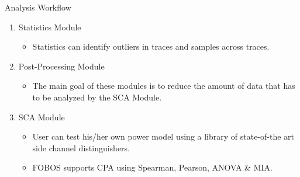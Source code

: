 \documentclass[xcolor=pdftex,dvipsnames,table,final]{beamer}
\begin{document}
\begin{frame}[fragile]{}
\begin{columns}[t]
\begin{column}{.31\linewidth}
\begin{block}{Analysis Workflow}
\begin{center}
        \end{center} 
        \vspace{-1ex}
        \begin{enumerate}
          \item Statistics Module
          \begin{itemize}
            \item Statistics can identify outliers in traces and samples across traces.
          \end{itemize}
          \item Post-Processing Module
          \begin{itemize}
            \item The main goal of these modules is to reduce the amount of data that 
                  has to be analyzed by the SCA Module.
          \end{itemize}
          \item SCA Module
          \begin{itemize}
            \item User can test his/her own power model using a library of state-of-the art side channel
                  distinguishers.
            \item FOBOS supports CPA using Spearman, Pearson, ANOVA \& MIA.
          \end{itemize}
        \end{enumerate}


\end{block}
\end{column}
\end{columns}
\end{frame}
\end{document}
